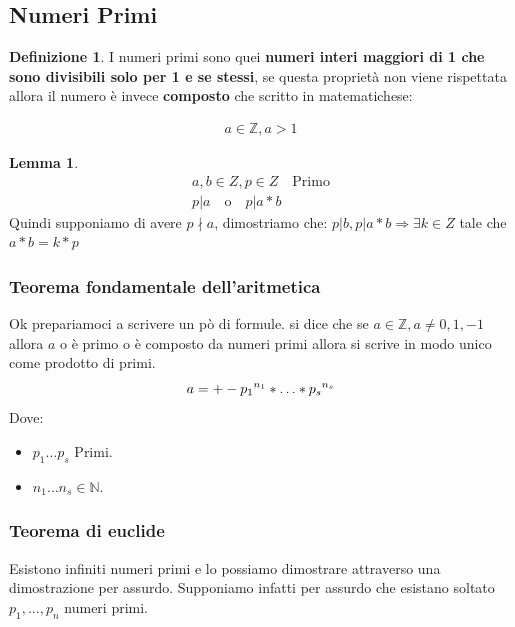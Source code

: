 \documentclass{article}
\theoremstyle{definition}
\newtheorem{definition}{Definizione}[section]
\newtheorem{lemma}{Lemma}[section]
\begin{document}
\subsection{Numeri Primi}\label{sec:numeri_primi}
\begin{definition}
I numeri primi sono quei \textbf{numeri interi maggiori di 1 che sono divisibili solo per 1 e se stessi}, se questa proprietà non viene rispettata allora il numero è invece \textbf{composto} che scritto in matematichese:
\end{definition}
\begin{align}
       a \in \mathbb{Z}, a>1
\end{align}

\begin{tcolorbox}
\begin{lemma}
        \begin{align*}
                a,b \in Z, p \in Z \quad \textrm{Primo} \\
                p|a \quad \textrm{o} \quad p|a*b
        \end{align*}
Quindi supponiamo di avere $p \nmid a$, dimostriamo che: \newline 
$p|b,  p|a*b \Rightarrow \exists k \in Z$ tale che $a*b = k*p$
\end{lemma}
\end{tcolorbox}



\subsubsection{Teorema fondamentale dell'aritmetica}\label{sec:teorema_fondamentale_dell_aritmentica}
Ok prepariamoci a scrivere un pò di formule. \newline
si dice che se $a \in \mathbb{Z}, a \not = 0,1,-1$ allora $a$ o è primo o è composto da numeri primi allora si scrive in modo unico come prodotto di primi.
\begin{equation*}
a = +- {p_1}^{n_1} * \ldots * {p_s}^{n_s} \\
\end{equation*}
Dove:
\begin{itemize}
        \item  $ p_1 \ldots p_s$ Primi. 
        \item  $ n_1 \ldots n_s \in \mathbb{N}$.
\end{itemize}




\subsubsection{Teorema di euclide}\label{sec:teorema_di_euclide}
Esistono infiniti numeri primi e lo possiamo dimostrare attraverso una dimostrazione per assurdo.
Supponiamo infatti per assurdo che esistano soltato $p_1,\ldots,p_n$ numeri primi. \par
\end{document}

